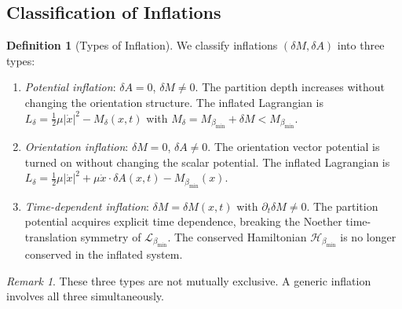 \documentclass[11pt,twocolumn,a4paper]{article}
\theoremstyle{plain}
\theoremstyle{definition}
\newtheorem{definition}[theorem]{Definition}
\theoremstyle{remark}
\newtheorem{remark}[theorem]{Remark}
\newcommand{\bmin}{\beta_{\min}}
\newcommand{\Lmin}{\mathcal{L}_{\bmin}}
\newcommand{\Hmin}{\mathcal{H}_{\bmin}}
\newcommand{\half}{\tfrac{1}{2}}
\begin{document}
\subsection{Classification of Inflations}

\begin{definition}[Types of Inflation]
\label{def:inflation_types}
We classify inflations $(\delta M, \delta A)$ into three types:
\begin{enumerate}[label=(\roman*)]
  \item \emph{Potential inflation}: $\delta A = 0$, $\delta M \neq 0$. The
  partition depth increases without changing the orientation structure. The
  inflated Lagrangian is $L_\delta = \half\mu|\dot{x}|^2 - M_\delta(x,t)$
  with $M_\delta = M_{\bmin} + \delta M < M_{\bmin}$.

  \item \emph{Orientation inflation}: $\delta M = 0$, $\delta A \neq 0$. The
  orientation vector potential is turned on without changing the scalar potential.
  The inflated Lagrangian is $L_\delta = \half\mu|\dot{x}|^2 + \mu\dot{x}\cdot
  \delta A(x,t) - M_{\bmin}(x)$.

  \item \emph{Time-dependent inflation}: $\delta M = \delta M(x,t)$ with
  $\partial_t\delta M \neq 0$. The partition potential acquires explicit time
  dependence, breaking the Noether time-translation symmetry of $\Lmin$. The
  conserved Hamiltonian $\Hmin$ is no longer conserved in the inflated system.
\end{enumerate}
\end{definition}

\begin{remark}
These three types are not mutually exclusive. A generic inflation involves all
three simultaneously.
\end{remark}
\end{document}
